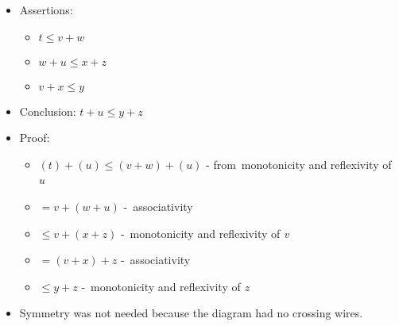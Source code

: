 \begin{itemize}
    \item  Assertions:
          \begin{itemize}
            \item $t \leq v+w$
            \item $w+u \leq x+z$
            \item $v+x \leq y$
          \end{itemize}
    \item Conclusion: $t+u \leq y+z$
    \item Proof:
          \begin{itemize}
            \item $(t)+(u) \leq (v+w)+(u)$ - from \,monotonicity and reflexivity of \emph{u}\,
            \item $= v+(w+u)$ - \,associativity\,
            \item $\leq v+(x+z)$ - \,monotonicity and reflexivity of \emph{v}\,
            \item $= (v+x)+z$ - \,associativity\,
            \item $\leq y+z$ - \,monotonicity and reflexivity of \emph{z}\,
          \end{itemize}

    \item  Symmetry was not needed because the diagram had no crossing wires.

  \end{itemize}
